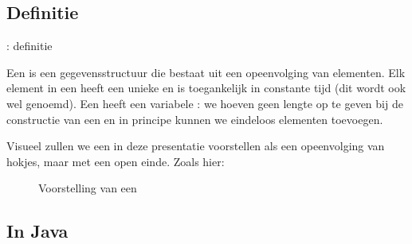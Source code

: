 \subsection{Definitie}
\begin{frame}{\dsarraylist{}: definitie}
\begin{definition}[\dsarraylist{}]
Een \term{\dsarraylist{}} is een gegevensstructuur die bestaat uit een opeenvolging van elementen. Elk element in een \dsarraylist{} heeft een unieke  en is toegankelijk in constante tijd (dit wordt ook wel  genoemd). Een \dsarraylist{} heeft een variabele : we hoeven geen lengte op te geven bij de constructie van een \dsarraylist{} en in principe kunnen we eindeloos elementen toevoegen.
\end{definition}
Visueel zullen we een \dsarraylist{} in deze presentatie voorstellen als een opeenvolging van hokjes, maar met een open einde. Zoals hier:
\begin{figure}
\caption{Voorstelling van een \dsarraylist{}}
\end{figure}
\end{frame}
\subsection{In Java}
